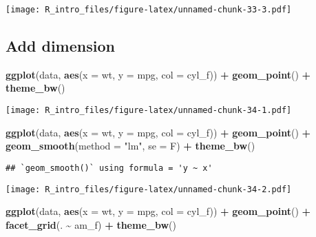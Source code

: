 \documentclass[
  a4paper,
]{article}
\newenvironment{Shaded}{\begin{snugshade}}{\end{snugshade}}
\newcommand{\AttributeTok}[1]{\textcolor[rgb]{0.13,0.29,0.53}{#1}}
\newcommand{\FunctionTok}[1]{\textcolor[rgb]{0.13,0.29,0.53}{\textbf{#1}}}
\newcommand{\NormalTok}[1]{#1}
\newcommand{\SpecialCharTok}[1]{\textcolor[rgb]{0.81,0.36,0.00}{\textbf{#1}}}
\newcommand{\StringTok}[1]{\textcolor[rgb]{0.31,0.60,0.02}{#1}}
\begin{document}
\texttt{[image: R\_intro\_files/figure-latex/unnamed-chunk-33-3.pdf]}

\subsection{Add dimension}\label{add-dimension}

\begin{Shaded}
\begin{Highlighting}[]
\FunctionTok{ggplot}\NormalTok{(data, }\FunctionTok{aes}\NormalTok{(}\AttributeTok{x =}\NormalTok{ wt, }\AttributeTok{y =}\NormalTok{ mpg, }\AttributeTok{col =}\NormalTok{ cyl\_f)) }\SpecialCharTok{+} \FunctionTok{geom\_point}\NormalTok{() }\SpecialCharTok{+}
    \FunctionTok{theme\_bw}\NormalTok{()}
\end{Highlighting}
\end{Shaded}

\texttt{[image: R\_intro\_files/figure-latex/unnamed-chunk-34-1.pdf]}

\begin{Shaded}
\begin{Highlighting}[]
\FunctionTok{ggplot}\NormalTok{(data, }\FunctionTok{aes}\NormalTok{(}\AttributeTok{x =}\NormalTok{ wt, }\AttributeTok{y =}\NormalTok{ mpg, }\AttributeTok{col =}\NormalTok{ cyl\_f)) }\SpecialCharTok{+} \FunctionTok{geom\_point}\NormalTok{() }\SpecialCharTok{+}
    \FunctionTok{geom\_smooth}\NormalTok{(}\AttributeTok{method =} \StringTok{"lm"}\NormalTok{, }\AttributeTok{se =}\NormalTok{ F) }\SpecialCharTok{+} \FunctionTok{theme\_bw}\NormalTok{()}
\end{Highlighting}
\end{Shaded}

\begin{verbatim}
## `geom_smooth()` using formula = 'y ~ x'
\end{verbatim}

\texttt{[image: R\_intro\_files/figure-latex/unnamed-chunk-34-2.pdf]}

\begin{Shaded}
\begin{Highlighting}[]
\FunctionTok{ggplot}\NormalTok{(data, }\FunctionTok{aes}\NormalTok{(}\AttributeTok{x =}\NormalTok{ wt, }\AttributeTok{y =}\NormalTok{ mpg, }\AttributeTok{col =}\NormalTok{ cyl\_f)) }\SpecialCharTok{+} \FunctionTok{geom\_point}\NormalTok{() }\SpecialCharTok{+}
    \FunctionTok{facet\_grid}\NormalTok{(. }\SpecialCharTok{\textasciitilde{}}\NormalTok{ am\_f) }\SpecialCharTok{+} \FunctionTok{theme\_bw}\NormalTok{()}
\end{Highlighting}
\end{Shaded}
\end{document}
